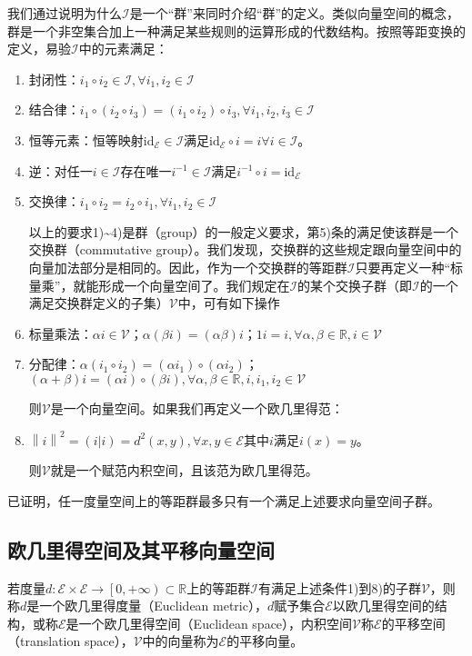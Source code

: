 \documentclass[main.tex]{subfiles}
\begin{document}
我们通过说明为什么$\mathcal{I}$是一个“群”来同时介绍“群”的定义。类似向量空间的概念，群是一个非空集合加上一种满足某些规则的运算形成的代数结构。按照等距变换的定义，易验$\mathcal{I}$中的元素满足：
\begin{enumerate}
    \item 封闭性：$i_1\circ i_2\in\mathcal{I},\forall i_1,i_2\in\mathcal{I}$
    \item 结合律：$i_1\circ \left(i_2\circ i_3\right)=\left(i_1\circ i_2\right)\circ i_3,\forall i_1,i_2,i_3\in\mathcal{I}$
    \item 恒等元素：恒等映射$\mathrm{id}_\mathcal{E}\in\mathcal{I}$满足$\mathrm{id}_\mathcal{E}\circ i=i\forall i\in\mathcal{I}$。
    \item 逆：对任一$i\in\mathcal{I}$存在唯一$i^{-1}\in\mathcal{I}$满足$i^{-1}\circ i=\mathrm{id}_\mathcal{E}$
    \item 交换律：$i_1\circ i_2=i_2\circ i_1,\forall i_1,i_2\in\mathcal{I}$
    
    以上的要求1)\textasciitilde 4)是群（group）的一般定义要求，第5)条的满足使该群是一个交换群（commutative group）。我们发现，交换群的这些规定跟向量空间中的向量加法部分是相同的。因此，作为一个交换群的等距群$\mathcal{I}$只要再定义一种“标量乘”，就能形成一个向量空间了。我们规定在$\mathcal{I}$的某个交换子群（即$\mathcal{I}$的一个满足交换群定义的子集）$\mathcal{V}$中，可有如下操作
    
    \item 标量乘法：$\alpha i\in\mathcal{V}$；$\alpha\left(\beta i\right)=\left(\alpha\beta\right)i$；$1i=i,\forall\alpha,\beta\in\mathbb{R},i\in\mathcal{V}$
    \item 分配律：$\alpha\left(i_1\circ i_2\right)=\left(\alpha i_1\right)\circ\left(\alpha i_2\right)$；$\left(\alpha+\beta\right)i=\left(\alpha i\right)\circ\left(\beta i\right),\forall\alpha,\beta\in\mathbb{R},i,i_1,i_2\in\mathcal{V}$
    
    则$\mathcal{V}$是一个向量空间。如果我们再定义一个欧几里得范：
    
    \item $\left\|i\right\|^2=\left(i|i\right)= d^2\left(x,y\right),\forall x,y\in\mathcal{E}$其中$i$满足$i\left(x\right)=y$。
    
    则$\mathcal{V}$就是一个赋范内积空间，且该范为欧几里得范。
\end{enumerate}

已证明，任一度量空间上的等距群最多只有一个满足上述要求向量空间子群\cite{Noll1974}。

\subsection{欧几里得空间及其平移向量空间}
\begin{definition}[欧几里得空间]
若度量$d:\mathcal{E}\times\mathcal{E}\rightarrow\left[0,+\infty\right)\subset\mathbb{R}$上的等距群$\mathcal{I}$有满足上述条件1)到8)的子群$\mathcal{V}$，则称$d$是一个欧几里得度量（Euclidean metric），$d$赋予集合$\mathcal{E}$以欧几里得空间的结构，或称$\mathcal{E}$是一个欧几里得空间（Euclidean space），内积空间$\mathcal{V}$称$\mathcal{E}$的平移空间（translation space），$\mathcal{V}$中的向量称为$\mathcal{E}$的平移向量。
\end{definition}
\end{document}

